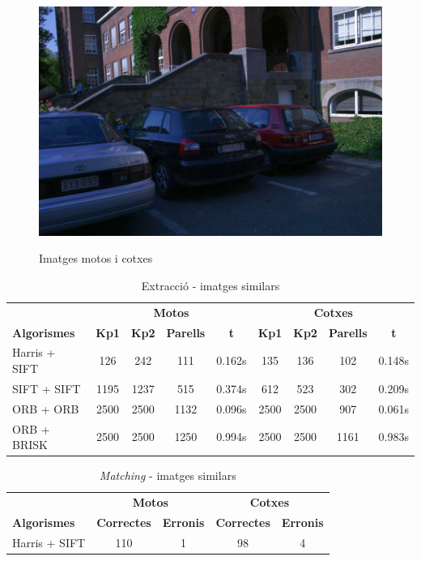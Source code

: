 \begin{figure}[!htb]
				\label{fig:awesome_image3}
			\endminipage\hfill
				\includegraphics[width=\linewidth]{images/experiments/cars6}
				\label{fig:awesome_image3}
			\endminipage
			\caption{Imatges motos i cotxes}
		\end{figure}

		\begin{table}[H]
			\begin{center}
				\begin{tabular}{l | c c c c | c c c c}
					& \multicolumn{4}{c|}{\textbf{Motos}} & \multicolumn{4}{c}{\textbf{Cotxes}} \\
					\textbf{Algorismes} & \textbf{Kp1} & \textbf{Kp2} & \textbf{Parells} & \textbf{t} & \textbf{Kp1} & \textbf{Kp2} & \textbf{Parells} & \textbf{t} \\ \hline
					Harris + SIFT & 126 & 242 & 111 & 0.162s & 135 & 136 & 102 & 0.148s \\
					SIFT + SIFT & 1195 & 1237 & 515 & 0.374s & 612 & 523 & 302 & 0.209s \\
					ORB + ORB & 2500 & 2500 & 1132 & 0.096s & 2500 & 2500 & 907 & 0.061s \\
					ORB + BRISK & 2500 & 2500 & 1250 & 0.994s & 2500 & 2500 & 1161 & 0.983s \\
				\end{tabular}
			\end{center}
			\caption{Extracció - imatges similars}
		\end{table}

		\begin{table}[H]
			\begin{center}
				\begin{tabular}{l | c c | c c}
					& \multicolumn{2}{c|}{\textbf{Motos}} & \multicolumn{2}{c}{\textbf{Cotxes}} \\
					\textbf{Algorismes} & \textbf{Correctes} & \textbf{Erronis} & \textbf{Correctes} & \textbf{Erronis} \\ \hline
					Harris + SIFT & 110 & 1 & 98 & 4 \\
				\end{tabular}
			\end{center}
			\caption{\textit{Matching} - imatges similars}
		\end{table}

